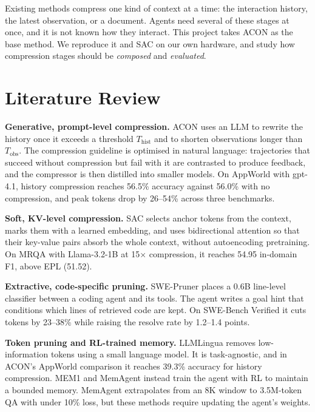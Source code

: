 \documentclass[10pt,a4paper]{article}
\begin{document}
Existing methods compress one kind of context at a time: the interaction
history, the latest observation, or a document. Agents need several of these
stages at once, and it is not known how they interact. This project takes
ACON \cite{ACON} as the base method. We reproduce it and SAC \cite{SAC} on our
own hardware, and study how compression stages should be \emph{composed} and
\emph{evaluated}.

\section{Literature Review}

\textbf{Generative, prompt-level compression.} ACON \cite{ACON} uses an LLM to
rewrite the history once it exceeds a threshold $T_{\mathrm{hist}}$ and to
shorten observations longer than $T_{\mathrm{obs}}$. The compression guideline
is optimised in natural language: trajectories that succeed without
compression but fail with it are contrasted to produce feedback, and the
compressor is then distilled into smaller models. On AppWorld \cite{AppWorld}
with gpt-4.1, history compression reaches 56.5\% accuracy against 56.0\% with
no compression, and peak tokens drop by 26--54\% across three benchmarks.

\textbf{Soft, KV-level compression.} SAC \cite{SAC} selects anchor tokens from
the context, marks them with a learned embedding, and uses bidirectional
attention so that their key-value pairs absorb the whole context, without
autoencoding pretraining. On MRQA with Llama-3.2-1B at 15$\times$
compression, it reaches 54.95 in-domain F1, above EPL (51.52).

\textbf{Extractive, code-specific pruning.} SWE-Pruner \cite{SWEPruner} places
a 0.6B line-level classifier between a coding agent and its tools. The agent
writes a goal hint that conditions which lines of retrieved code are kept. On
SWE-Bench Verified it cuts tokens by 23--38\% while raising the resolve rate
by 1.2--1.4 points.

\textbf{Token pruning and RL-trained memory.} LLMLingua \cite{LLMLingua}
removes low-information tokens using a small language model. It is
task-agnostic, and in ACON's AppWorld comparison it reaches 39.3\% accuracy
for history compression. MEM1 \cite{MEM1} and MemAgent \cite{MemAgent} instead
train the agent with RL to maintain a bounded memory. MemAgent extrapolates
from an 8K window to 3.5M-token QA with under 10\% loss, but these methods
require updating the agent's weights.
\end{document}
